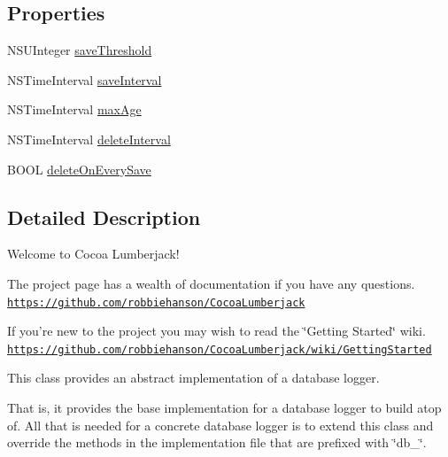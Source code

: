 \subsection*{Properties}
\begin{DoxyCompactItemize}
\item 
N\-S\-U\-Integer \hyperlink{interface_d_d_abstract_database_logger_a0f72f6042f001e34d18489e3c3864cec}{save\-Threshold}
\item 
N\-S\-Time\-Interval \hyperlink{interface_d_d_abstract_database_logger_ad9d79d66d716e4965fec5e7c137f729e}{save\-Interval}
\item 
N\-S\-Time\-Interval \hyperlink{interface_d_d_abstract_database_logger_a48793e11870e3dce07bbb4ca9ea3a302}{max\-Age}
\item 
N\-S\-Time\-Interval \hyperlink{interface_d_d_abstract_database_logger_a6ae601d281eea50ffcb0f27c50ec3700}{delete\-Interval}
\item 
B\-O\-O\-L \hyperlink{interface_d_d_abstract_database_logger_abc644d3087912778b30bc9e68945a5bf}{delete\-On\-Every\-Save}
\end{DoxyCompactItemize}


\subsection{Detailed Description}
Welcome to Cocoa Lumberjack!

The project page has a wealth of documentation if you have any questions. \href{https://github.com/robbiehanson/CocoaLumberjack}{\tt https\-://github.\-com/robbiehanson/\-Cocoa\-Lumberjack}

If you're new to the project you may wish to read the \char`\"{}\-Getting Started\char`\"{} wiki. \href{https://github.com/robbiehanson/CocoaLumberjack/wiki/GettingStarted}{\tt https\-://github.\-com/robbiehanson/\-Cocoa\-Lumberjack/wiki/\-Getting\-Started}

This class provides an abstract implementation of a database logger.

That is, it provides the base implementation for a database logger to build atop of. All that is needed for a concrete database logger is to extend this class and override the methods in the implementation file that are prefixed with \char`\"{}db\-\_\-\char`\"{}. 

